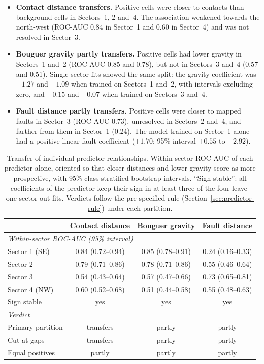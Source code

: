 \documentclass[pdflatex,sn-basic]{sn-jnl}%
\begin{document}
\begin{itemize}
\item \textbf{Contact distance transfers.} Positive cells were closer to contacts than background cells in Sectors~1, 2 and~4. The association weakened towards the north-west (ROC-AUC 0.84 in Sector~1 and 0.60 in Sector~4) and was not resolved in Sector~3.
\item \textbf{Bouguer gravity partly transfers.} Positive cells had lower gravity in Sectors~1 and~2 (ROC-AUC 0.85 and 0.78), but not in Sectors~3 and~4 (0.57 and 0.51). Single-sector fits showed the same split: the gravity coefficient was $-1.27$ and $-1.09$ when trained on Sectors~1 and~2, with intervals excluding zero, and $-0.15$ and $-0.07$ when trained on Sectors~3 and~4.
\item \textbf{Fault distance partly transfers.} Positive cells were closer to mapped faults in Sector~3 (ROC-AUC 0.73), unresolved in Sectors~2 and~4, and farther from them in Sector~1 (0.24). The model trained on Sector~1 alone had a positive linear fault coefficient ($+1.70$; 95\% interval $+0.55$ to $+2.92$).
\end{itemize}

\begin{table}[tbp]
\centering
\caption{Transfer of individual predictor relationships. Within-sector ROC-AUC of each predictor alone, oriented so that closer distances and lower gravity score as more prospective, with 95\% class-stratified bootstrap intervals. ``Sign stable'': all coefficients of the predictor keep their sign in at least three of the four leave-one-sector-out fits. Verdicts follow the pre-specified rule (Section~\ref{sec:predictor-rule}) under each partition.}
\label{tab:predictors}
\footnotesize\setlength{\tabcolsep}{4pt}
\begin{tabular}{lccc}
\toprule
& Contact distance & Bouguer gravity & Fault distance \\
\midrule
\multicolumn{4}{l}{\emph{Within-sector ROC-AUC (95\% interval)}} \\
Sector 1 (SE) & 0.84 (0.72--0.94) & 0.85 (0.78--0.91) & 0.24 (0.16--0.33) \\
Sector 2 & 0.79 (0.71--0.86) & 0.78 (0.71--0.86) & 0.55 (0.46--0.64) \\
Sector 3 & 0.54 (0.43--0.64) & 0.57 (0.47--0.66) & 0.73 (0.65--0.81) \\
Sector 4 (NW) & 0.60 (0.52--0.68) & 0.51 (0.44--0.58) & 0.55 (0.48--0.63) \\
\midrule
Sign stable & yes & yes & yes \\
\multicolumn{4}{l}{\emph{Verdict}} \\
Primary partition & transfers & partly & partly \\
Cut at gaps & transfers & partly & partly \\
Equal positives & partly & partly & partly \\
\bottomrule
\end{tabular}
\end{table}
\end{document}
